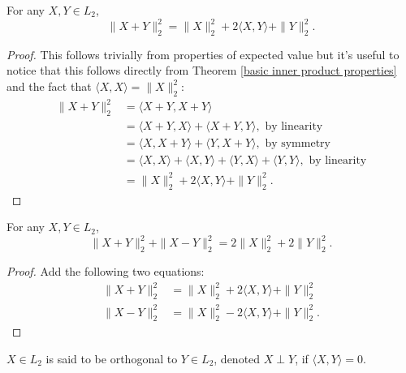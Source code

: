 \begin{theorem}[{\bf Pythagorean}]
For any $X, Y\in L_2$, 
\[ \|X+Y \|_2^2 = \|X \|_2^2 +2\langle X, Y\rangle +\| Y \|_2^2.\]
\end{theorem}
\begin{proof}
This follows trivially from properties of expected value but it's useful to notice that this follows directly from Theorem \ref{basic inner product properties} and the fact that $\langle X, X\rangle = \|X\|_2^2$:
\begin{align*}
\|X+Y \|_2^2 
&= \langle X+Y, X+Y\rangle \\
&= \langle X+Y, X\rangle + \langle X+Y, Y\rangle,\,\,\text{by linearity}\\
&= \langle X, X+Y\rangle + \langle Y,  X+Y \rangle,\,\,\text{by symmetry}\\
&= \langle X, X\rangle +\langle X, Y\rangle + \langle Y,  X \rangle+\langle Y,  Y \rangle,\,\,\text{by linearity}\\
& =  \|X \|_2^2 +2\langle X, Y\rangle +\| Y \|_2^2.
\end{align*}
\end{proof}



\begin{theorem}[{\bf Parallelogram}]
For any $X, Y\in L_2$, 
\[ \|X+Y \|_2^2 + \|X-Y \|_2^2= 2\|X \|_2^2 + 2\| Y \|_2^2.\]
\end{theorem}
\begin{proof}
Add the following two equations:
\begin{align*}
\|X+Y \|_2^2 &= \|X \|_2^2 +2\langle X, Y\rangle +\| Y \|_2^2 \\
\|X-Y \|_2^2 &= \|X \|_2^2 -2\langle X, Y\rangle +\| Y \|_2^2.
\end{align*}
\end{proof}



\begin{definition}[{\bf Orthogonal}]
$X\in L_2$ is said to be orthogonal to $Y\in L_2$, denoted $X\perp Y$, if $\langle X, Y\rangle = 0$.
\end{definition}



